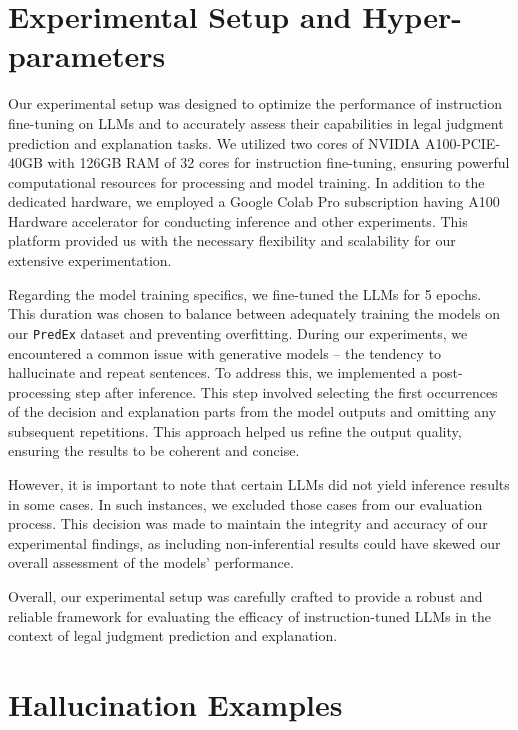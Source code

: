 \newpage
\section{Experimental Setup and Hyper-parameters}
\label{sec:Experimental-setup}

Our experimental setup was designed to optimize the performance of instruction fine-tuning on LLMs and to accurately assess their capabilities in legal judgment prediction and explanation tasks. We utilized two cores of NVIDIA A100-PCIE-40GB with 126GB RAM of 32 cores for instruction fine-tuning, ensuring powerful computational resources for processing and model training. In addition to the dedicated hardware, we employed a Google Colab Pro subscription having A100 Hardware accelerator for conducting inference and other experiments. This platform provided us with the necessary flexibility and scalability for our extensive experimentation.

Regarding the model training specifics, we fine-tuned the LLMs for 5 epochs. This duration was chosen to balance between adequately training the models on our \texttt{PredEx} dataset and preventing overfitting. During our experiments, we encountered a common issue with generative models – the tendency to hallucinate and repeat sentences. To address this, we implemented a post-processing step after inference. This step involved selecting the first occurrences of the decision and explanation parts from the model outputs and omitting any subsequent repetitions. This approach helped us refine the output quality, ensuring the results to be coherent and concise.

However, it is important to note that certain LLMs did not yield inference results in some cases. In such instances, we excluded those cases from our evaluation process. This decision was made to maintain the integrity and accuracy of our experimental findings, as including non-inferential results could have skewed our overall assessment of the models' performance.

Overall, our experimental setup was carefully crafted to provide a robust and reliable framework for evaluating the efficacy of instruction-tuned LLMs in the context of legal judgment prediction and explanation.


\section{Hallucination Examples}
\label{sec:Hallucination-example}


